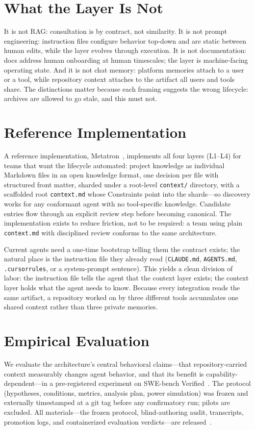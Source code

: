 \documentclass[sigconf,nonacm]{acmart}
\newcommand{\ctx}{\texttt{context.md}}
\begin{document}
\section{What the Layer Is Not}
It is not RAG: consultation is by contract, not similarity. It is not prompt
engineering: instruction files configure behavior top-down and are static between
human edits, while the layer evolves through execution. It is not documentation:
docs address human onboarding at human timescales; the layer is machine-facing
operating state. And it is not chat memory: platform memories attach to a user or
a tool, while repository context attaches to the artifact all users and tools
share. The distinctions matter because each framing suggests the wrong lifecycle:
archives are allowed to go stale, and this must not.

\section{Reference Implementation}\label{sec:impl}
A reference implementation, Metatron~\cite{metatron}, implements all four layers
(L1--L4) for teams that want the lifecycle automated: project knowledge as
individual Markdown files in an open knowledge format, one decision per file with
structured front matter, sharded under a root-level \texttt{context/} directory,
with a scaffolded root \ctx{} whose Constraints point into the shards---so
discovery works for any conformant agent with no tool-specific knowledge. Candidate
entries flow through an explicit review step before becoming canonical. The
implementation exists to reduce friction, not to be required: a team using plain
\ctx{} with disciplined review conforms to the same architecture.

Current agents need a one-time bootstrap telling them the contract exists; the
natural place is the instruction file they already read (\texttt{CLAUDE.md},
\texttt{AGENTS.md}, \texttt{.cursorrules}, or a system-prompt sentence). This
yields a clean division of labor: the instruction file tells the agent that the
context layer exists; the context layer holds what the agent needs to know.
Because every integration reads the same artifact, a repository worked on by three
different tools accumulates one shared context rather than three private memories.

\section{Empirical Evaluation}\label{sec:eval}
We evaluate the architecture's central behavioral claims---that repository-carried
context measurably changes agent behavior, and that its benefit is
capability-dependent---in a pre-registered experiment on SWE-bench
Verified~\cite{swebench,swebenchverified}. The protocol (hypotheses, conditions, metrics, analysis
plan, power simulation) was frozen and externally timestamped at a git tag before
any confirmatory run; pilots are excluded. All materials---the frozen protocol,
blind-authoring audit, transcripts, promotion logs, and containerized evaluation
verdicts---are released~\cite{artifact}.
\end{document}
